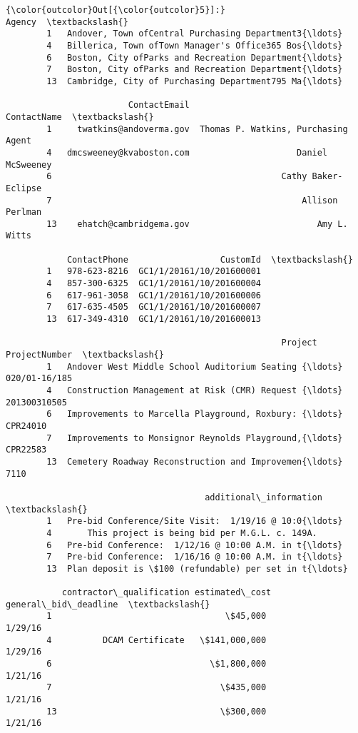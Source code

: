 \documentclass[11pt]{article}
\begin{document}
\begin{Verbatim}[commandchars=\\\{\}]
{\color{outcolor}Out[{\color{outcolor}5}]:}                                                Agency  \textbackslash{}
        1   Andover, Town ofCentral Purchasing Department3{\ldots}   
        4   Billerica, Town ofTown Manager's Office365 Bos{\ldots}   
        6   Boston, City ofParks and Recreation Department{\ldots}   
        7   Boston, City ofParks and Recreation Department{\ldots}   
        13  Cambridge, City of Purchasing Department795 Ma{\ldots}   
        
                        ContactEmail                          ContactName  \textbackslash{}
        1     twatkins@andoverma.gov  Thomas P. Watkins, Purchasing Agent   
        4   dmcsweeney@kvaboston.com                     Daniel McSweeney   
        6                                             Cathy Baker-Eclipse   
        7                                                 Allison Perlman   
        13    ehatch@cambridgema.gov                         Amy L. Witts   
        
            ContactPhone                  CustomId  \textbackslash{}
        1   978-623-8216  GC1/1/20161/10/201600001   
        4   857-300-6325  GC1/1/20161/10/201600004   
        6   617-961-3058  GC1/1/20161/10/201600006   
        7   617-635-4505  GC1/1/20161/10/201600007   
        13  617-349-4310  GC1/1/20161/10/201600013   
        
                                                      Project  ProjectNumber  \textbackslash{}
        1   Andover West Middle School Auditorium Seating {\ldots}  020/01-16/185   
        4   Construction Management at Risk (CMR) Request {\ldots}   201300310505   
        6   Improvements to Marcella Playground, Roxbury: {\ldots}       CPR24010   
        7   Improvements to Monsignor Reynolds Playground,{\ldots}       CPR22583   
        13  Cemetery Roadway Reconstruction and Improvemen{\ldots}           7110   
        
                                       additional\_information  \textbackslash{}
        1   Pre-bid Conference/Site Visit:  1/19/16 @ 10:0{\ldots}   
        4       This project is being bid per M.G.L. c. 149A.   
        6   Pre-bid Conference:  1/12/16 @ 10:00 A.M. in t{\ldots}   
        7   Pre-bid Conference:  1/16/16 @ 10:00 A.M. in t{\ldots}   
        13  Plan deposit is \$100 (refundable) per set in t{\ldots}   
        
           contractor\_qualification estimated\_cost general\_bid\_deadline  \textbackslash{}
        1                                  \$45,000              1/29/16   
        4          DCAM Certificate   \$141,000,000              1/29/16   
        6                               \$1,800,000              1/21/16   
        7                                 \$435,000              1/21/16   
        13                                \$300,000              1/21/16   
        

\end{Verbatim}
\end{document}
